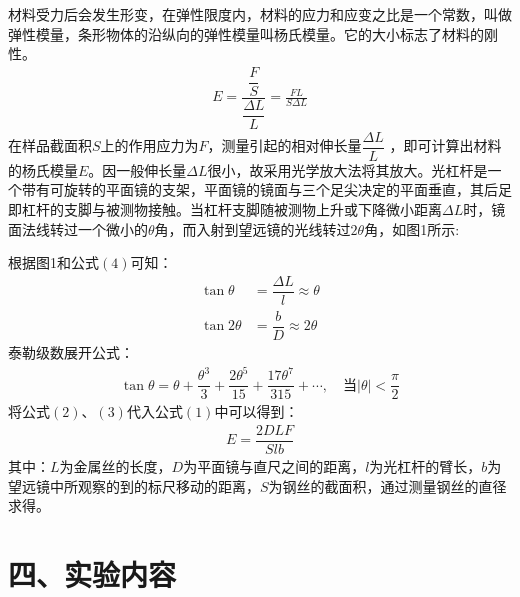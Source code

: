 \documentclass[11pt]{article}
\begin{document}
材料受力后会发生形变，在弹性限度内，材料的应力和应变之比是一个常数，叫做
弹性模量，条形物体的沿纵向的弹性模量叫杨氏模量。它的大小标志了材料的刚性。
\begin{align}
    E=\dfrac{\dfrac{F}{S}}{\dfrac{\Delta L}{L}}=\frac{FL}{S\Delta L}
\end{align}
在样品截面积$S$上的作用应力为$F$，测量引起的相对伸长量$\dfrac{\Delta L}{L}$ ，即可计算出材料的杨氏模量$E$。因一般伸长量$\Delta L$很小，故采用光学放大法将其放大。光杠杆是一个带有可旋转的平面镜的支架，平面镜的镜面与三个足尖决定的平面垂直，其后足即杠杆的支脚与被测物接触。当杠杆支脚随被测物上升或下降微小距离$\Delta L$时，镜面法线转过一个微小的$\theta$角，而入射到望远镜的光线转过$2\theta$角，如图1所示:

根据图1和公式$(4)$可知：
\begin{align}
    \tan{\theta}&=\dfrac{\Delta L}{l}\approx\theta \\
    \tan{2\theta}&=\dfrac{b}{D}\approx2\theta
\end{align}
泰勒级数展开公式：
\begin{align}
    \tan{\theta}=\theta+\dfrac{\theta^3}{3}+\dfrac{2\theta^5}{15}+\dfrac{17\theta^7}{315}+\cdots,\quad\text{当}|\theta|<\dfrac{\pi}{2}
\end{align}
将公式$(2)$、$(3)$代入公式$(1)$中可以得到：
\begin{align}
    E=\dfrac{2DLF}{Slb}
\end{align}
其中：$L$为金属丝的长度，$D$为平面镜与直尺之间的距离，$l$为光杠杆的臂长，$b$为望远镜中所观察的到的标尺移动的距离，$S$为钢丝的截面积，通过测量钢丝的直径求得。

\section*{四、实验内容}
\end{document}
